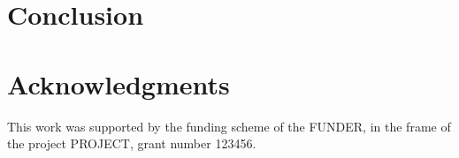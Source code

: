 \section{Conclusion}\label{sec:conclusion}

\lipsum[2-3]

\section*{Acknowledgments} This work was supported by the funding scheme of the
FUNDER, in the frame of the project PROJECT, grant number 123456.
